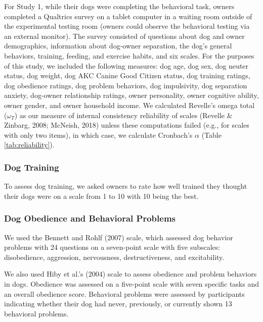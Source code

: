 \documentclass[
  pub,floatsintext]{apa6}
\begin{document}
For Study 1, while their dogs were completing the behavioral task, owners completed a Qualtrics survey on a tablet computer in a waiting room outside of the experimental testing room (owners could observe the behavioral testing via an external monitor). The survey consisted of questions about dog and owner demographics, information about dog-owner separation, the dog's general behaviors, training, feeding, and exercise habits, and six scales. For the purposes of this study, we included the following measures: dog age, dog sex, dog neuter status, dog weight, dog AKC Canine Good Citizen status, dog training ratings, dog obedience ratings, dog problem behaviors, dog impulsivity, dog separation anxiety, dog-owner relationship ratings, owner personality, owner cognitive ability, owner gender, and owner household income. We calculated Revelle's omega total (\(\omega_{T}\)) as our measure of internal consistency reliability of scales (Revelle \& Zinbarg, 2008; McNeish, 2018) unless these computations failed (e.g., for scales with only two items), in which case, we calculate Cronbach's \(\alpha\) (Table \ref{tab:reliability}).

\hypertarget{dog-training}{%
\subsubsection{Dog Training}\label{dog-training}}

To assess dog training, we asked owners to rate how well trained they thought their dogs were on a scale from 1 to 10 with 10 being the best.

\hypertarget{dog-obedience-and-behavioral-problems}{%
\subsubsection{Dog Obedience and Behavioral Problems}\label{dog-obedience-and-behavioral-problems}}

We used the Bennett and Rohlf (2007) scale, which assessed dog behavior problems with 24 questions on a seven-point scale with five subscales: disobedience, aggression, nervousness, destructiveness, and excitability.

We also used Hiby et al.'s (2004) scale to assess obedience and problem behaviors in dogs. Obedience was assessed on a five-point scale with seven specific tasks and an overall obedience score. Behavioral problems were assessed by participants indicating whether their dog had never, previously, or currently shown 13 behavioral problems.
\end{document}
